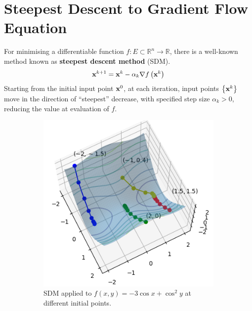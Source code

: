 \documentclass[../dissertation.tex]{subfiles}
\begin{document}
\section{Steepest Descent to Gradient Flow Equation}
For minimising a differentiable function $f:E \subset \mathbb{R}^n \rightarrow \mathbb{R}$, there is a well-known method known as \textbf{steepest descent method} (SDM)\cite{doi:10.1137/1.9781611974997.ch8}.
\begin{equation}
    \mathbf{x}^{k+1} = \mathbf{x}^{k} - \alpha_k \nabla f \left( \mathbf{x}^{k} \right)
    \label{equ: SDM}
\end{equation}
Starting from the initial input point $\mathbf{x}^{0}$, at each iteration, input points $\left\{ \mathbf{x}^{k} \right\}$ move in the direction of ``steepest'' decrease,
with specified step size $\alpha_k > 0$,
reducing the value at evaluation of $f$.
\begin{figure}[tbp]
    \centering
    \begin{subfigure}[b]{0.4\textwidth}
        \includegraphics[width=\textwidth]{sections/gradientFlowImgs/sdm}
        \caption{SDM applied to $f(x,y) = -3 \cos x + \cos^2 y$ at different initial points.}
        \label{fig: SDM}
    \end{subfigure}
    \hspace{1cm}
    \begin{subfigure}[b]{0.4\textwidth}

\end{subfigure}
\end{figure}
\end{document}
